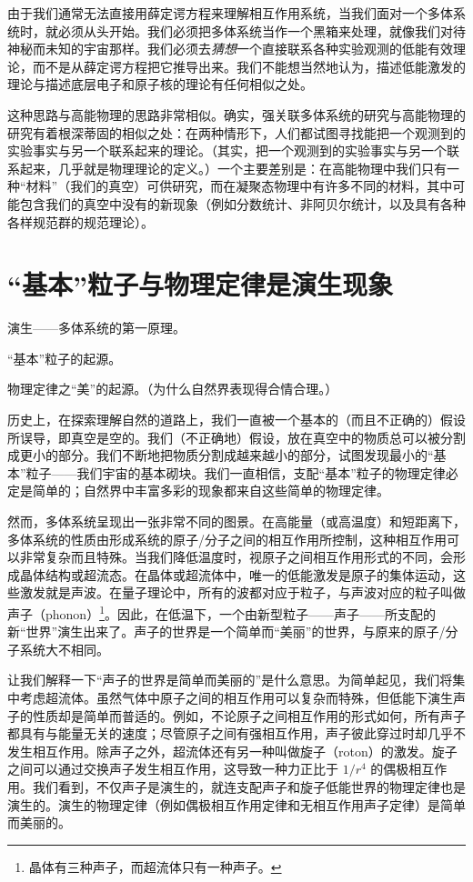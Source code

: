 由于我们通常无法直接用薛定谔方程来理解相互作用系统，当我们面对一个多体系统时，就必须从头开始。我们必须把多体系统当作一个黑箱来处理，就像我们对待神秘而未知的宇宙那样。我们必须去\emph{猜想}一个直接联系各种实验观测的低能有效理论，而不是从薛定谔方程把它推导出来。我们不能想当然地认为，描述低能激发的理论与描述底层电子和原子核的理论有任何相似之处。

这种思路与高能物理的思路非常相似。确实，强关联多体系统的研究与高能物理的研究有着根深蒂固的相似之处：在两种情形下，人们都试图寻找能把一个观测到的实验事实与另一个联系起来的理论。（其实，把一个观测到的实验事实与另一个联系起来，几乎就是物理理论的定义。）一个主要差别是：在高能物理中我们只有一种“材料”（我们的真空）可供研究，而在凝聚态物理中有许多不同的材料，其中可能包含我们的真空中没有的新现象（例如分数统计、非阿贝尔统计，以及具有各种各样规范群的规范理论）。

\section{“基本”粒子与物理定律是演生现象}

\begin{keypoints}
\item 演生——多体系统的第一原理。
\item “基本”粒子的起源。
\item 物理定律之“美”的起源。（为什么自然界表现得合情合理。）
\end{keypoints}

历史上，在探索理解自然的道路上，我们一直被一个基本的（而且不正确的）假设所误导，即真空是空的。我们（不正确地）假设，放在真空中的物质总可以被分割成更小的部分。我们不断地把物质分割成越来越小的部分，试图发现最小的“基本”粒子——我们宇宙的基本砌块。我们一直相信，支配“基本”粒子的物理定律必定是简单的；自然界中丰富多彩的现象都来自这些简单的物理定律。

然而，多体系统呈现出一张非常不同的图景。在高能量（或高温度）和短距离下，多体系统的性质由形成系统的原子/分子之间的相互作用所控制，这种相互作用可以非常复杂而且特殊。当我们降低温度时，视原子之间相互作用形式的不同，会形成晶体结构或超流态。在晶体或超流体中，唯一的低能激发是原子的集体运动，这些激发就是声波。在量子理论中，所有的波都对应于粒子，与声波对应的粒子叫做声子（phonon）\footnote{晶体有三种声子，而超流体只有一种声子。}。因此，在低温下，一个由新型粒子——声子——所支配的新“世界”演生出来了。声子的世界是一个简单而“美丽”的世界，与原来的原子/分子系统大不相同。

让我们解释一下“声子的世界是简单而美丽的”是什么意思。为简单起见，我们将集中考虑超流体。虽然气体中原子之间的相互作用可以复杂而特殊，但低能下演生声子的性质却是简单而普适的。例如，不论原子之间相互作用的形式如何，所有声子都具有与能量无关的速度；尽管原子之间有强相互作用，声子彼此穿过时却几乎不发生相互作用。除声子之外，超流体还有另一种叫做旋子（roton）的激发。旋子之间可以通过交换声子发生相互作用，这导致一种力正比于 $1/r^4$ 的偶极相互作用。我们看到，不仅声子是演生的，就连支配声子和旋子低能世界的物理定律也是演生的。演生的物理定律（例如偶极相互作用定律和无相互作用声子定律）是简单而美丽的。

